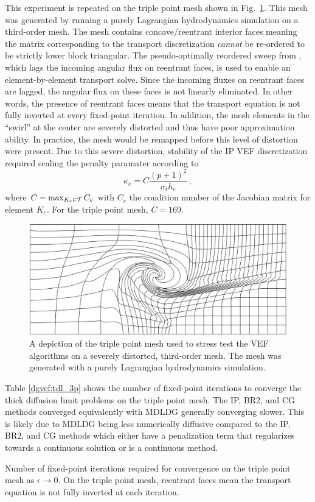 \documentclass[../doc.tex]{subfiles}
\begin{document}
This experiment is repeated on the triple point mesh shown in Fig.~\ref{dgvef:3point_mesh}. This mesh was generated by running a purely Lagrangian hydrodynamics simulation on a third-order mesh. The mesh contains concave/reentrant interior faces meaning the matrix corresponding to the transport discretization \emph{cannot} be re-ordered to be strictly lower block triangular. The pseudo-optimally reordered sweep from \cite{graph_sweeps}, which lags the incoming angular flux on reentrant faces, is used to enable an element-by-element transport solve. Since the incoming fluxes on reentrant faces are lagged, the angular flux on these faces is not linearly eliminated. In other words, the presence of reentrant faces means that the transport equation is not fully inverted at every fixed-point iteration. In addition, the mesh elements in the ``swirl'' at the center are severely distorted and thus have poor approximation ability. In practice, the mesh would be remapped before this level of distortion were present. Due to this severe distortion, stability of the IP VEF discretization required scaling the penalty paramater according to 
	\begin{equation}
		\kappa_e = C \frac{(p+1)^2}{\sigma_t h_e} \,,
	\end{equation}	
where $C = \max_{K_e \in \mathcal{T}} C_e$ with $C_e$ the condition number of the Jacobian matrix for element $K_e$. For the triple point mesh, $C=169$.
\begin{figure}
\centering
\includegraphics[width=.65\textwidth]{data/img/3point.png}
\caption{A depiction of the triple point mesh used to stress test the VEF algorithms on a severely distorted, third-order mesh. The mesh was generated with a purely Lagrangian hydrodynamics simulation. }
\label{dgvef:3point_mesh}
\end{figure}

Table \ref{dgvef:tdl_3p} shows the number of fixed-point iterations to converge the thick diffusion limit problems on the triple point mesh. The IP, BR2, and CG methods converged equivalently with MDLDG generally converging slower. This is likely due to MDLDG being less numerically diffusive compared to the IP, BR2, and CG methods which either have a penalization term that regularizes towards a continuous solution or is a continuous method. 
\begin{table}
\centering
\caption{Number of fixed-point iterations required for convergence on the triple point mesh as $\epsilon \rightarrow 0$. On the triple point mesh, reentrant faces mean the transport equation is not fully inverted at each iteration.}
\label{dgvef:tdl_3p}

\end{table}
\end{document}
